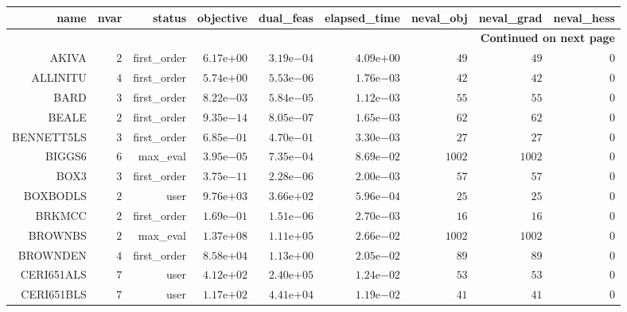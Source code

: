 \begin{longtable}{rrrrrrrrr}
\hline
name & nvar & status & objective & dual\_feas & elapsed\_time & neval\_obj & neval\_grad & neval\_hess \\\hline
\endhead
\hline
\multicolumn{9}{r}{{\bfseries Continued on next page}}\\
\hline
\endfoot
\endlastfoot
AKIVA & \(     2\) & first\_order & \( 6.17\)e\(+00\) & \( 3.19\)e\(-04\) & \( 4.09\)e\(+00\) & \(    49\) & \(    49\) & \(     0\) \\
ALLINITU & \(     4\) & first\_order & \( 5.74\)e\(+00\) & \( 5.53\)e\(-06\) & \( 1.76\)e\(-03\) & \(    42\) & \(    42\) & \(     0\) \\
BARD & \(     3\) & first\_order & \( 8.22\)e\(-03\) & \( 5.84\)e\(-05\) & \( 1.12\)e\(-03\) & \(    55\) & \(    55\) & \(     0\) \\
BEALE & \(     2\) & first\_order & \( 9.35\)e\(-14\) & \( 8.05\)e\(-07\) & \( 1.65\)e\(-03\) & \(    62\) & \(    62\) & \(     0\) \\
BENNETT5LS & \(     3\) & first\_order & \( 6.85\)e\(-01\) & \( 4.70\)e\(-01\) & \( 3.30\)e\(-03\) & \(    27\) & \(    27\) & \(     0\) \\
BIGGS6 & \(     6\) & max\_eval & \( 3.95\)e\(-05\) & \( 7.35\)e\(-04\) & \( 8.69\)e\(-02\) & \(  1002\) & \(  1002\) & \(     0\) \\
BOX3 & \(     3\) & first\_order & \( 3.75\)e\(-11\) & \( 2.28\)e\(-06\) & \( 2.00\)e\(-03\) & \(    57\) & \(    57\) & \(     0\) \\
BOXBODLS & \(     2\) & user & \( 9.76\)e\(+03\) & \( 3.66\)e\(+02\) & \( 5.96\)e\(-04\) & \(    25\) & \(    25\) & \(     0\) \\
BRKMCC & \(     2\) & first\_order & \( 1.69\)e\(-01\) & \( 1.51\)e\(-06\) & \( 2.70\)e\(-03\) & \(    16\) & \(    16\) & \(     0\) \\
BROWNBS & \(     2\) & max\_eval & \( 1.37\)e\(+08\) & \( 1.11\)e\(+05\) & \( 2.66\)e\(-02\) & \(  1002\) & \(  1002\) & \(     0\) \\
BROWNDEN & \(     4\) & first\_order & \( 8.58\)e\(+04\) & \( 1.13\)e\(+00\) & \( 2.05\)e\(-02\) & \(    89\) & \(    89\) & \(     0\) \\
CERI651ALS & \(     7\) & user & \( 4.12\)e\(+02\) & \( 2.40\)e\(+05\) & \( 1.24\)e\(-02\) & \(    53\) & \(    53\) & \(     0\) \\
CERI651BLS & \(     7\) & user & \( 1.17\)e\(+02\) & \( 4.41\)e\(+04\) & \( 1.19\)e\(-02\) & \(    41\) & \(    41\) & \(     0\) \\

\end{longtable}
